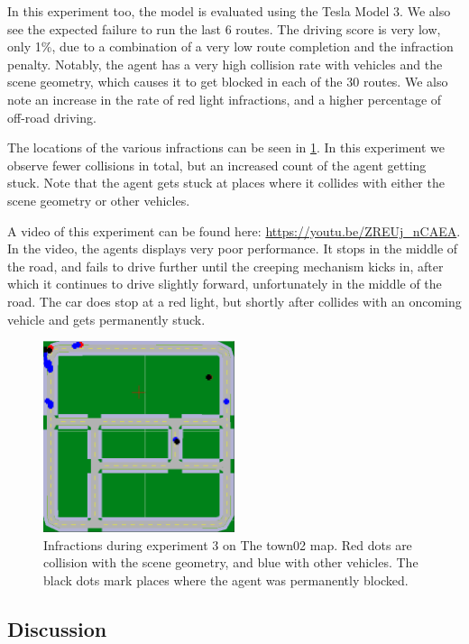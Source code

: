In this experiment too, the model is evaluated using the Tesla Model 3.
We also see the expected failure to run the last 6 routes.
The driving score is very low, only 1\%,
due to a combination of a very low route completion and the infraction penalty.
Notably, the agent has a very high collision rate with vehicles and the scene geometry,
which causes it to get blocked in each of the 30 routes.
We also note an increase in the rate of red light infractions,
and a higher percentage of off-road driving.

The locations of the various infractions can be seen in \cref{fig:exp3:town02}.
In this experiment we observe fewer collisions in total,
but an increased count of the agent getting stuck.
Note that the agent gets stuck at places where it collides with either the scene geometry or other vehicles.

A video of this experiment can be found here: \url{https://youtu.be/ZREUj_nCAEA}.
In the video, the agents displays very poor performance.
It stops in the middle of the road,
and fails to drive further until the creeping mechanism kicks in,
after which it continues to drive slightly forward,
unfortunately in the middle of the road.
The car does stop at a red light,
but shortly after collides with an oncoming vehicle and gets permanently stuck.

\begin{figure}
    \centering
    \includegraphics[width=0.5\textwidth]{chapters/4-experiments-results/figures/exp3-Town02.png}
    \caption{Infractions during experiment 3 on The town02 map.
    Red dots are collision with the scene geometry,
    and blue with other vehicles.
    The black dots mark places where the agent was permanently blocked.}
    \label{fig:exp3:town02}
\end{figure}


\subsection{Discussion}

